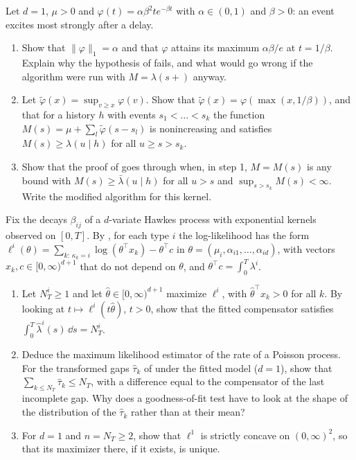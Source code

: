 \begin{exercise}\label{ex:hk-thinning}
\medium Let $d=1$, $\mu>0$ and $\varphi(t)=\alpha\beta^2te^{-\beta t}$ with $\alpha\in(0,1)$ and $\beta>0$: an event
excites most strongly after a delay.
\begin{enumerate}[label=(\alph*)]
  \item Show that $\|\varphi\|_1=\alpha$ and that $\varphi$ attains its maximum $\alpha\beta/e$ at $t=1/\beta$.
    Explain why the hypothesis of  fails, and what would go wrong if the algorithm were run
    with $M=\lambda(s+)$ anyway.
  \item Let $\tilde\varphi(x)=\sup_{v\ge x}\varphi(v)$. Show that $\tilde\varphi(x)=\varphi(\max(x,1/\beta))$, and that
    for a history $h$ with events $s_1<\dots<s_k$ the function $M(s)=\mu+\sum_l\tilde\varphi(s-s_l)$ is
    nonincreasing and satisfies $M(s)\ge\lambda(u\mid h)$ for all $u\ge s>s_k$.
  \item Show that the proof of  goes through when, in step 1, $M=M(s)$ is any bound with
    $M(s)\ge\bar\lambda(u\mid h)$ for all $u>s$ and $\sup_{s>s_k}M(s)<\infty$. Write the modified algorithm for
    this kernel.
\end{enumerate}
\end{exercise}

\begin{exercise}\label{ex:hk-mle-identity}
\medium Fix the decays $\beta_{ij}$ of a $d$-variate Hawkes process with exponential kernels observed on $[0,T]$. By
, for each type $i$ the log-likelihood has the form
$\ell^i(\theta)=\sum_{k:\,\kappa_k=i}\log(\theta^\top x_k)-\theta^\top c$ in $\theta=(\mu_i,\alpha_{i1},\dots,\alpha_{id})$,
with vectors $x_k,c\in[0,\infty)^{d+1}$ that do not depend on $\theta$, and $\theta^\top c=\int_0^T\lambda^i$.
\begin{enumerate}[label=(\alph*)]
  \item Let $N^i_T\ge1$ and let $\hat\theta\in[0,\infty)^{d+1}$ maximize $\ell^i$, with $\hat\theta^\top x_k>0$ for all $k$.
    By looking at $t\mapsto\ell^i(t\hat\theta)$, $t>0$, show that the fitted compensator satisfies
    $\int_0^T\hat\lambda^i(s)\,\dd s=N^i_T$.
  \item Deduce the maximum likelihood estimator of the rate of a Poisson process. For the transformed gaps
    $\hat\tau_k$ of  under the fitted model ($d=1$), show that
    $\sum_{k\le N_T}\hat\tau_k\le N_T$, with a difference equal to the compensator of the last incomplete gap.
    Why does a goodness-of-fit test have to look at the shape of the distribution of the $\hat\tau_k$ rather than at
    their mean?
  \item For $d=1$ and $n=N_T\ge2$, show that $\ell^1$ is strictly concave on $(0,\infty)^2$, so that its maximizer
    there, if it exists, is unique.
\end{enumerate}
\end{exercise}

